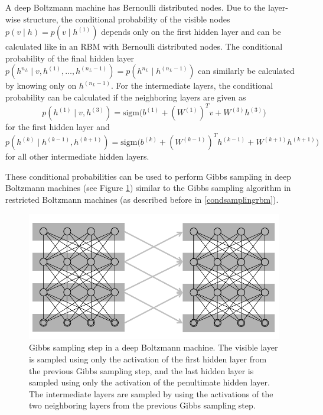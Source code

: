 \documentclass[12pt]{article}
\newcommand{\sigm}{\mathrm{sigm}}
\begin{document}
A deep Boltzmann machine has Bernoulli distributed nodes.
Due to the layer-wise structure, the conditional probability of the visible nodes $p(v \mid h) = p(v \mid h^{(1)})$ depends only on the first hidden layer and can be calculated like in an RBM with Bernoulli distributed nodes.
The conditional probability of the final hidden layer $p \left( h^{n_L} \mid v, h^{(1)}, \dots, h^{(n_L -1)} \right) = p \left( h^{n_L} \mid h^{(n_L -1)} \right)$ can similarly be calculated by knowing only on $h^{(n_L-1)}$.
For the intermediate layers, the conditional probability can be calculated if the neighboring layers are given as
\begin{equation}
p\left(h^{(1)} \mid v, h^{(3)}\right) = \sigm \bigg( b^{(1)} + (W^{(1)})^T v + W^{(3)} h^{(3)} \bigg)
\label{dbmcondprobfirsthidden}
\end{equation}
for the first hidden layer and
\begin{equation}
p\left(h^{(k)} \mid h^{(k-1)}, h^{(k+1)} \right) = \sigm \bigg( b^{(k)} + (W^{(k-1)})^T h^{(k-1)} + W^{(k+1)} h^{(k+1)} \bigg)
\label{dbmcondprobintermediate}
\end{equation}
for all other intermediate hidden layers.

These conditional probabilities can be used to perform Gibbs sampling in deep Boltzmann machines (see Figure \ref{fig:dbmsampling}) similar to the Gibbs sampling algorithm in restricted Boltzmann machines (as described before in \ref{condsamplingrbm}).

\begin{figure}[h]
   \centering
   \includegraphics[scale=1.0]{images/dbmsampling.pdf}
   \caption{Gibbs sampling step in a deep Boltzmann machine. The visible layer is sampled using only the activation of the first hidden layer from the previous Gibbs sampling step, and the last hidden layer is sampled using only the activation of the penultimate hidden layer. The intermediate layers are sampled by using the activations of the two neighboring layers from the previous Gibbs sampling step. }
   \label{fig:dbmsampling}
 \end{figure}
\end{document}
